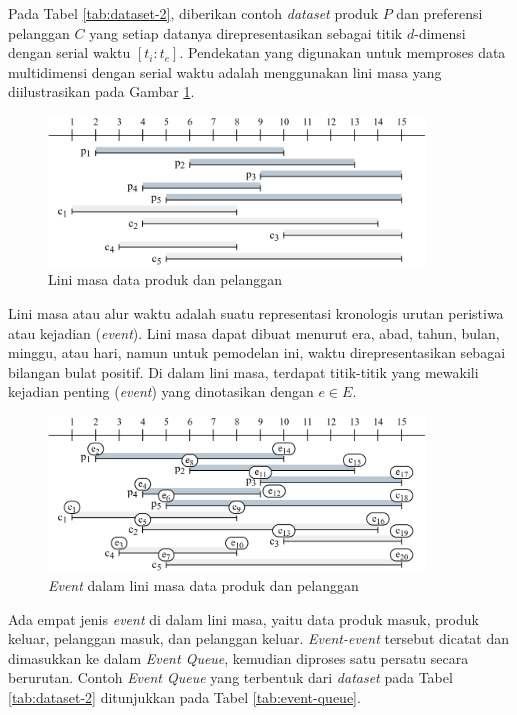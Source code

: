 Pada Tabel \ref{tab:dataset-2}, diberikan contoh \textit{dataset} produk $P$ dan preferensi pelanggan $C$ yang setiap datanya direpresentasikan sebagai titik $d$-dimensi dengan serial waktu $[t_i:t_e]$. Pendekatan yang digunakan untuk memproses data multidimensi dengan serial waktu adalah menggunakan lini masa yang diilustrasikan pada Gambar \ref{fig:timeline}.
\begin{figure}[H]
	\centering
	\includegraphics[width=10cm]{assets/img/bab3/timeline-polos.png}
	\caption{Lini masa data produk dan pelanggan}
	\label{fig:timeline}
\end{figure}

Lini masa atau alur waktu adalah suatu representasi kronologis urutan peristiwa atau kejadian (\textit{event}). Lini masa dapat dibuat menurut era, abad, tahun, bulan, minggu, atau hari, namun untuk pemodelan ini, waktu direpresentasikan sebagai bilangan bulat positif. Di dalam lini masa, terdapat titik-titik yang mewakili kejadian penting (\textit{event}) yang dinotasikan dengan $e \in E$. 
\begin{figure}[H]
	\centering
	\includegraphics[width=10cm]{assets/img/bab3/timeline-event.png}
	\caption{\textit{Event} dalam lini masa data produk dan pelanggan}
	\label{fig:timeline-event}
\end{figure}

\pagebreak
Ada empat jenis \textit{event} di dalam lini masa, yaitu data produk masuk, produk keluar, pelanggan masuk, dan pelanggan keluar. \textit{Event-event} tersebut dicatat dan dimasukkan ke dalam \textit{Event Queue}, kemudian diproses satu persatu secara berurutan. Contoh \textit{Event Queue} yang terbentuk dari \textit{dataset} pada Tabel \ref{tab:dataset-2} ditunjukkan pada Tabel \ref{tab:event-queue}.

